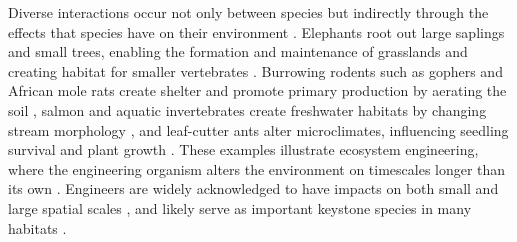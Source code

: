 \documentclass[twocolumn,preprintnumbers,amsmath,amssymb,superscriptaddress,linenumbers]{revtex4-1}
\begin{document}


Diverse interactions occur not only between species but indirectly through the effects that species have on their environment \cite{Jones1994,Olff2009,OdlingSmee2013}.
Elephants root out large saplings and small trees, enabling the formation and maintenance of grasslands \cite{Leuthold1996,Haynes2012} and creating habitat for smaller vertebrates \cite{Pringle2008}.
Burrowing rodents such as gophers and African mole rats create shelter and promote primary production by aerating the soil \cite{Reichman2002,Hagenah2013}, salmon and aquatic invertebrates create freshwater habitats by changing stream morphology \cite{Moore2006}, and leaf-cutter ants alter microclimates, influencing seedling survival and plant growth \cite{Meyer2011}.
These examples illustrate ecosystem engineering, where the engineering organism alters the environment on timescales longer than its own \cite{Hastings2007}.
Engineers are widely acknowledged to have impacts on both small and large spatial scales \cite{Wright2006b}, and likely serve as important keystone species in many habitats \cite{Jones2012}.
\end{document}
